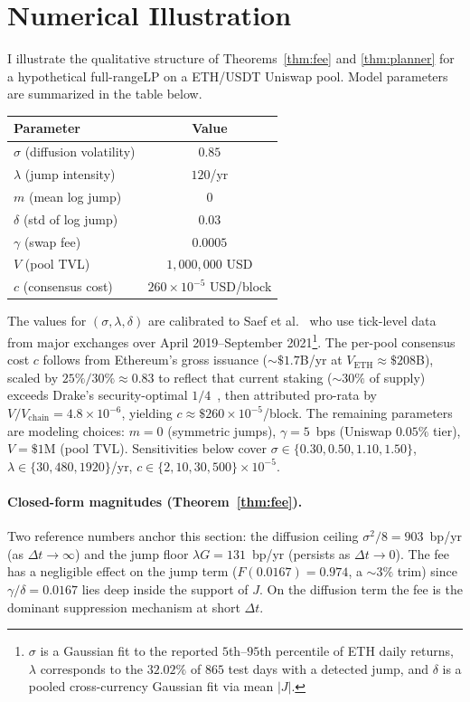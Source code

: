 \documentclass[runningheads]{llncs}
\newcommand{\dt}{\Delta t}
\newcommand{\1}{\mathbf{1}}
\begin{document}
\section{Numerical Illustration}\label{sec:numerics}

I illustrate the qualitative structure of Theorems~\ref{thm:fee} and \ref{thm:planner} for a hypothetical full-rangeLP on a ETH/USDT Uniswap pool. Model parameters are summarized in the table below. 
\begin{center}
\begin{tabular}{lc}
\toprule
Parameter & Value \\
\midrule
$\sigma$ (diffusion volatility) & $0.85$ \\
$\lambda$ (jump intensity) & $120$/yr \\
$m$ (mean log jump) & $0$ \\
$\delta$ (std of log jump) & $0.03$ \\
$\gamma$ (swap fee) & $0.0005$ \\
$V$ (pool TVL) & $1{,}000{,}000$ USD \\
$c$ (consensus cost) & $260 \times 10^{-5}$ USD/block \\
\bottomrule
\end{tabular}
\end{center}
The values for $(\sigma, \lambda, \delta)$ are calibrated to Saef et al.~\cite{saef2024temporal} who use tick-level data from major exchanges over April 2019--September 2021\footnote{$\sigma$ is a Gaussian fit to the reported $5$th--$95$th percentile of ETH daily returns, $\lambda$ corresponds to the $32.02\%$ of $865$ test days with a detected jump, and $\delta$ is a pooled cross-currency Gaussian fit via mean $|J|$.}. The per-pool consensus cost $c$ follows from Ethereum's gross issuance ($\sim\!\$1.7$B/yr at $V_{\text{ETH}} \approx \$208$B), scaled by $25\%/30\% \approx 0.83$ to reflect that current staking ($\sim\!30\%$ of supply) exceeds Drake's security-optimal $1/4$~\cite{drake2025croissant,elowsson2024endgame}, then attributed pro-rata by $V/V_{\text{chain}} = 4.8 \times 10^{-6}$, yielding $c \approx \$260 \times 10^{-5}$/block. The remaining parameters are modeling choices: $m = 0$ (symmetric jumps), $\gamma = 5$~bps (Uniswap $0.05\%$ tier), $V = \$1$M (pool TVL). Sensitivities below cover $\sigma \in \{0.30, 0.50, 1.10, 1.50\}$, $\lambda \in \{30, 480, 1920\}$/yr, $c \in \{2, 10, 30, 500\} \times 10^{-5}$.

\paragraph{Closed-form magnitudes (Theorem~\ref{thm:fee}).}
Two reference numbers anchor this section: the diffusion ceiling $\sigma^2/8 = 903$~bp/yr (as $\dt \to \infty$) and the jump floor $\lambda G = 131$~bp/yr (persists as $\dt \to 0$). The fee has a negligible effect on the jump term ($F(0.0167) = 0.974$, a $\sim\!3\%$ trim) since $\gamma/\delta = 0.0167$ lies deep inside the support of $J$. On the diffusion term the fee is the dominant suppression mechanism at short $\dt$.
\end{document}
